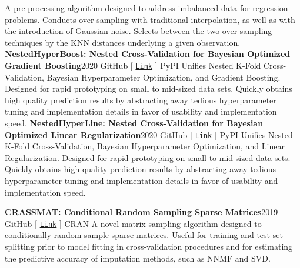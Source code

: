 \documentclass{article}
\begin{document}
        A pre-processing algorithm designed to address imbalanced data for regression problems. Conducts over-sampling with traditional interpolation, as well as with the introduction of Gaussian noise. Selects between the two over-sampling techniques by the KNN distances underlying a given observation.\newline\newline
        \textbf{NestedHyperBoost: Nested Cross-Validation for Bayesian Optimized Gradient Boosting}\hfill{2020}\newline
        \faGithub\space GitHub [ \href{https://github.com/nickkunz/nestedhyperboost}{\texttt{Link}} ] \space\faPython\space PyPI\newline\newline
        Unifies Nested K-Fold Cross-Validation, Bayesian Hyperparameter Optimization, and Gradient Boosting. Designed for rapid prototyping on small to mid-sized data sets. Quickly obtains high quality prediction results by abstracting away tedious hyperparameter tuning and implementation details in favor of usability and implementation speed.\newline\newline
        \textbf{NestedHyperLine: Nested Cross-Validation for Bayesian Optimized Linear Regularization}\hfill{2020}\newline
        \faGithub\space GitHub [ \href{https://github.com/nickkunz/nestedhyperline}{\texttt{Link}} ] \space\faPython\space PyPI\newline\newline
        Unifies Nested K-Fold Cross-Validation, Bayesian Hyperparameter Optimization, and Linear Regularization. Designed for rapid prototyping on small to mid-sized data sets. Quickly obtains high quality prediction results by abstracting away tedious hyperparameter tuning and implementation details in favor of usability and implementation speed.\newline\newline
        
        \noindent
        \textbf{CRASSMAT: Conditional Random Sampling Sparse Matrices}\hfill{2019}\newline
        \faGithub\space GitHub [ \href{https://github.com/nickkunz/crassmat}{\texttt{Link}} ] \space\faRProject\space CRAN\newline\newline
        A novel matrix sampling algorithm designed to conditionally random sample sparse matrices. Useful for training and test set splitting prior to model fitting in cross-validation procedures and for estimating the predictive accuracy of imputation methods, such as NNMF and SVD.
\end{document}
